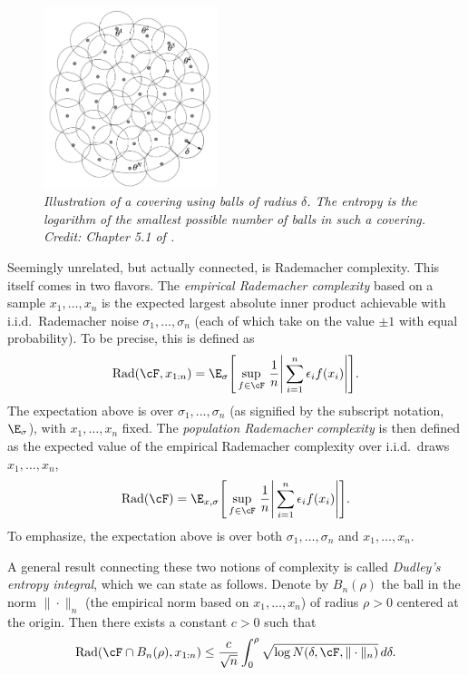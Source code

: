 \documentclass{article}
\begin{document}
\begin{figure}[tb]
\centering
\includegraphics[width=0.45\textwidth]{covering.pdf}
\caption{\it Illustration of a covering using balls of radius $\delta$. The
  entropy is the logarithm of the smallest possible number of balls in such a
  covering. Credit: Chapter 5.1 of \citet{wainwright2019high}.}
\label{fig:covering}
\end{figure}

Seemingly unrelated, but actually connected, is Rademacher complexity. This
itself comes in two flavors. The \emph{empirical Rademacher complexity} based on
a sample $x_1,\dots,x_n$ is the expected largest absolute inner product
achievable with i.i.d.\ Rademacher noise $\sigma_1,\dots,\sigma_n$ (each of 
which take on the value $\pm 1$ with equal probability). To be precise, this is 
defined as   
\[
\Rad(\cF, x_{1:n}) = \E_\sigma \Bigg[ \sup_{f \in \cF} \, \frac{1}{n} \Bigg| 
\sum_{i=1}^n \epsilon_i f(x_i) \Bigg| \Bigg]. 
\]
The expectation above is over $\sigma_1,\dots,\sigma_n$ (as signified by the
subscript notation, $\E_\sigma$), with $x_1,\dots,x_n$ fixed. The
\emph{population Rademacher complexity} is then defined as the expected value of
the empirical Rademacher complexity over i.i.d.\ draws $x_1,\dots,x_n$,
\[
\Rad(\cF) = \E_{x,\sigma} \Bigg[ \sup_{f \in \cF} \, \frac{1}{n} \Bigg| 
\sum_{i=1}^n \epsilon_i f(x_i) \Bigg| \Bigg]. 
\]
To emphasize, the expectation above is over both $\sigma_1,\dots,\sigma_n$ and
$x_1,\dots,x_n$.

A general result connecting these two notions of complexity is called
\emph{Dudley's entropy integral}, which we can state as follows. Denote by
$B_n(\rho)$ the ball in the norm $\|\cdot\|_n$ (the empirical norm based on
$x_1,\dots,x_n$) of radius $\rho>0$ centered at the origin. Then there exists a
constant $c>0$ such that  
\begin{equation}
\label{eq:dudley_integral}
\Rad(\cF \cap B_n(\rho), x_{1:n}) \leq \frac{c}{\sqrt n} \int_0^\rho
\sqrt{\log N(\delta, \cF, \|\cdot\|_n)} \, d \delta.
\end{equation}
\end{document}
